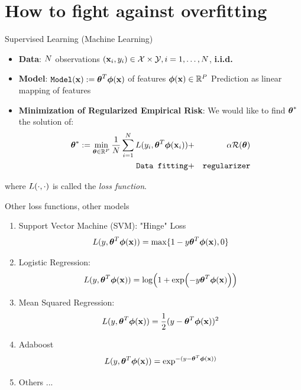 \documentclass[xcolor=pdftex,dvipsnames,table,mathserif]{beamer}
\begin{document}


\section{How to fight against overfitting}


\begin{frame}{Supervised Learning (Machine Learning)}
\begin{itemize}
\item \textbf{Data}: $N$ observations $(\mathbf{x}_i,y_i) \in \mathcal{X} \times \mathcal{Y}, i=1,\ldots,N$, \alert{\textbf{i.i.d.}}
\item \textbf{Model}: $\texttt{Model}(\mathbf{x}):=\boldsymbol{\theta}^T\boldsymbol{\phi} (\mathbf{x})$ of features  $\boldsymbol{\phi} (\mathbf{x}) \in \mathbb{R}^P$ \alert{Prediction as linear mapping of features}
\item \textbf{Minimization of Regularized Empirical Risk}: We would like to find $\boldsymbol{\theta}^{*}$ the solution of:
\begin{eqnarray*}
\boldsymbol{\theta}^{*}:=\min_{\boldsymbol{\theta} \in \mathbb{R}^P} \frac{1}{N} \sum_{i=1}^{N} L(y_i,\boldsymbol{\theta}^T\boldsymbol{\phi} (\mathbf{x}_i))&  + &\alpha \mathcal{R}(\boldsymbol{\theta}) \\
\texttt{Data fitting}& + &\texttt{regularizer}
\end{eqnarray*}
\end{itemize}
where $L(\cdot,\cdot)$ is called the  \emph{loss function}.
\end{frame}



\begin{frame}{Other loss functions, other models}
\begin{enumerate}
\item Support Vector Machine (SVM): "Hinge" Loss 
\begin{equation}
L(y,\boldsymbol{\theta}^T\boldsymbol{\phi}(\mathbf{x}))=\max \{1-y\boldsymbol{\theta}^T\boldsymbol{\phi}(\mathbf{x}),0\}
\end{equation}
\item Logistic Regression: 
\begin{equation}
L(y,\boldsymbol{\theta}^T\boldsymbol{\phi}(\mathbf{x}))=\log (1+\exp (-y\boldsymbol{\theta}^T\boldsymbol{\phi}(\mathbf{x})))
\end{equation}
\item Mean Squared Regression:
\begin{equation}
L(y,\boldsymbol{\theta}^T\boldsymbol{\phi}(\mathbf{x}))=\frac{1}{2}(y-\boldsymbol{\theta}^T\boldsymbol{\phi}(\mathbf{x}))^2
\end{equation}
\item Adaboost
\begin{equation}
L(y,\boldsymbol{\theta}^T\boldsymbol{\phi}(\mathbf{x}))=\exp^{ -(y-\boldsymbol{\theta}^T\boldsymbol{\phi}(\mathbf{x}))}
\end{equation}
\item Others ...
\end{enumerate}
\end{frame}
\end{document}
